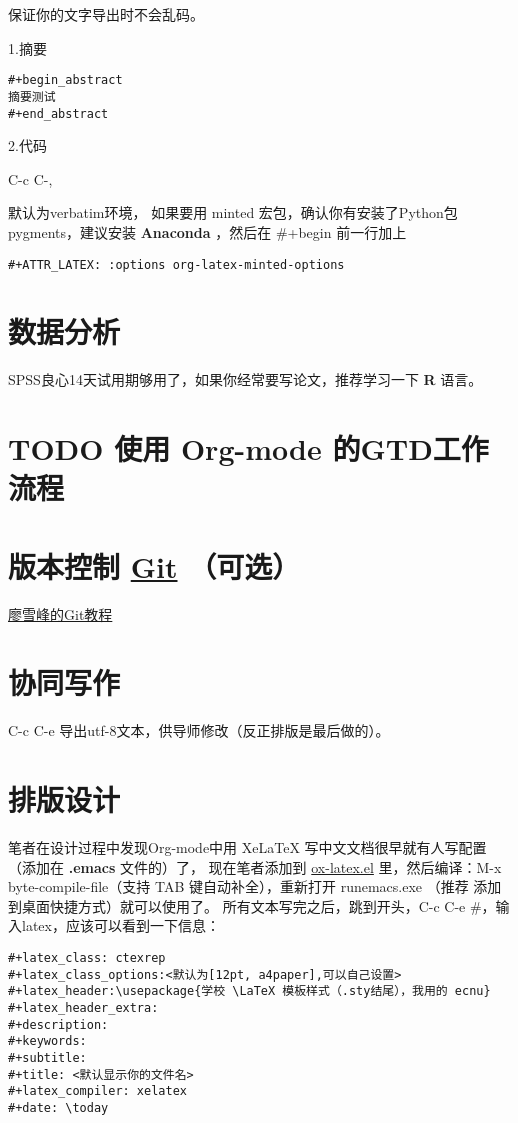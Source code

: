 \documentclass{ctexrep}
\begin{document}
保证你的文字导出时不会乱码。

1.摘要

\begin{verbatim}
#+begin_abstract
摘要测试
#+end_abstract
\end{verbatim}

2.代码

C-c C-,

默认为verbatim环境，
如果要用 minted 宏包，确认你有安装了Python包pygments，建议安装 \textbf{Anaconda} ，然后在 \#+begin
前一行加上

\begin{verbatim}
#+ATTR_LATEX: :options org-latex-minted-options
\end{verbatim}

\section{数据分析}
\label{sec:orgfb26bd8}
SPSS良心14天试用期够用了，如果你经常要写论文，推荐学习一下 \textbf{R} 语言。
\section{{\bfseries\sffamily TODO} 使用 Org-mode 的GTD工作流程}
\label{sec:org118ba18}
\section{版本控制 \href{https://git-scm.com/downloads}{Git} （可选）}
\label{sec:orge0ffa6b}
\href{https://www.liaoxuefeng.com/wiki/896043488029600}{廖雪峰的Git教程}
\section{协同写作}
\label{sec:org410cedb}
C-c C-e 导出utf-8文本，供导师修改（反正排版是最后做的）。
\section{排版设计}
\label{sec:org77c0f8e}
笔者在设计过程中发现Org-mode中用 XeLaTeX 写中文文档很早就有人写配置（添加在 \textbf{.emacs} 文件的）了，
现在笔者添加到 \href{https://github.com/Tom007Cheung/Org-XeLaTeX/blob/master/ox-latex.el}{ox-latex.el} 里，然后编译：M-x byte-compile-file（支持 TAB 键自动补全），重新打开 runemacs.exe （推荐
添加到桌面快捷方式）就可以使用了。
所有文本写完之后，跳到开头，C-c C-e \#，输入latex，应该可以看到一下信息：

\begin{verbatim}
#+latex_class: ctexrep
#+latex_class_options:<默认为[12pt, a4paper],可以自己设置>
#+latex_header:\usepackage{学校 \LaTeX 模板样式（.sty结尾），我用的 ecnu}
#+latex_header_extra:
#+description:
#+keywords:
#+subtitle:
#+title: <默认显示你的文件名>
#+latex_compiler: xelatex
#+date: \today
\end{verbatim}
\end{document}
